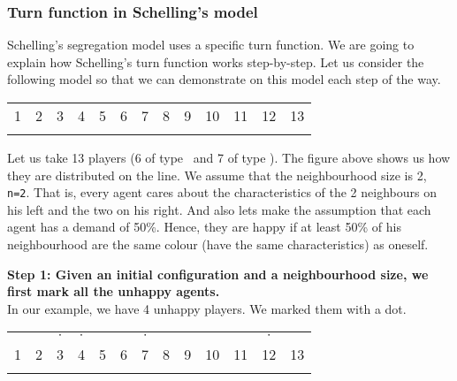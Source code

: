 \documentclass[../main.tex]{subfiles}
\begin{document}
\subsubsection{Turn function in Schelling's model}

Schelling's segregation model uses a specific turn function. We are going to explain how Schelling's turn function works step-by-step. Let us consider the following model so that we can demonstrate on this model each step of the way. 

\begin{table}[H]
\begin{center}
{\begin{tabular}{| c |c| c| c| c |c| c |c| c |c|c|c|c|}
\hline
  1 & 2 &3 &4 &5 &6  &7 &8 &9 & 10 & 11 & 12 & 13 \\
\x &\x &\z &\x &\z &\z  &\x &\z &\x & \z&\x &\z & \x\\
 \hline
\end{tabular}}
\end{center}
\end{table}

Let us take 13 players (6 of type \z\ and 7 of type \x). The figure above shows us how they are distributed on the line. We assume that the neighbourhood size is 2, \verb|n=2|. That is, every agent cares about the characteristics of the 2 neighbours on his left and the two on his right. And also lets make the assumption that each agent has a demand of 50\%. Hence, they are happy if at least 50\% of his neighbourhood are the same colour (have the same characteristics) as oneself.


\textbf{Step 1: Given an initial configuration and a neighbourhood size, we first mark all the unhappy agents.} \\ 

In our example, we have 4 unhappy players. We marked them with a dot.

\begin{table}[H]
\begin{center}
{\begin{tabular}{| c |c| c| c| c |c| c |c| c |c|c|c|c|}
\hline
 & &  $\cdot$ &$\cdot$ & & & $\cdot$ & &  & & & $\cdot$ &  \\
  1 & 2 &3 &4 &5 &6  &7 &8 &9 & 10 & 11 & 12 & 13 \\
\x &\x &\z &\x &\z &\z  &\x &\z &\x & \z&\x &\z & \x\\
 \hline
\end{tabular}}
\end{center}
\end{table}
\end{document}
